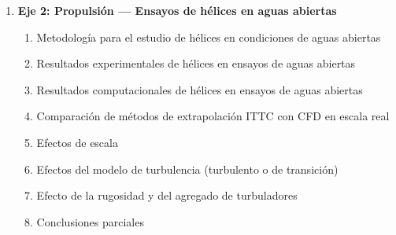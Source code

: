 \begin{enumerate}
\begin{enumerate}[label*=\arabic*.]
    \item Influencia del modelo de turbulencia en la determinación del factor de forma
    \begin{enumerate}[label*=\arabic*.]
       \item Introducción y motivación del estudio
       \item Metodología y configuración numérica
       \item Modelos de turbulencia analizados ($k$–$\varepsilon$, $k$–$\varepsilon$ realizable, $k$–$\omega$, $k$–$\omega$ SST)
       \item Resultados comparativos de resistencia viscosa
       \item Efecto sobre el factor de forma
       \item Descomposición de resistencia según origen friccional y de presión viscosa
       \item Recomendaciones para selección de modelos en estudios de escala
       \item Conclusiones parciales
    \end{enumerate}

    \item Efecto de la relación L/B en el factor de forma
    \begin{enumerate}[label*=\arabic*.]
      \item Motivación y observaciones sobre L/B en cascos de baja esbeltez
      \item Presentación de pesqueros con distintos L/B
      \item Análisis CFD y comparación de distribución de presión y resistencia viscosa
      \item Generalización del comportamiento observado y formulación empírica
      \item Implicancias para el escalado y la extrapolación de resultados
      \item Conclusiones parciales
    \end{enumerate}
  \end{enumerate}

  \item \textbf{Eje 2: Propulsión — Ensayos de hélices en aguas abiertas}
  \begin{enumerate}[label*=\arabic*.]
    \item Metodología para el estudio de hélices en condiciones de aguas abiertas
    \item Resultados experimentales de hélices en ensayos de aguas abiertas
    \item Resultados computacionales de hélices en ensayos de aguas abiertas
    \item Comparación de métodos de extrapolación ITTC con CFD en escala real
    \item Efectos de escala  
    \item Efectos del modelo de turbulencia (turbulento o de transición) 
    \item Efecto de la rugosidad y del agregado de turbuladores
    \item Conclusiones parciales 
  \end{enumerate}


\end{enumerate}
